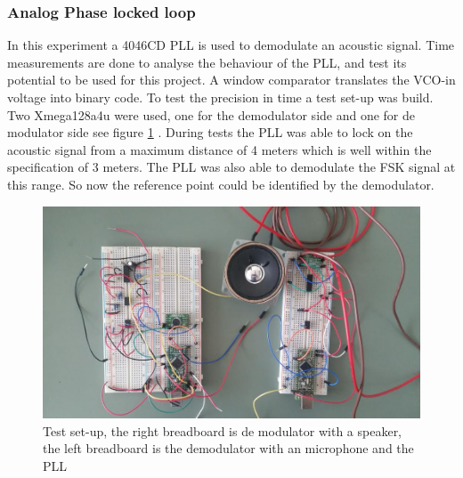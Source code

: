 \documentclass[10pt,a4paper]{article}
\begin{document}
\subsubsection{Analog Phase locked loop}
In this experiment a 4046CD PLL is used to demodulate an acoustic signal. Time measurements are done to analyse the behaviour of the PLL, and test its potential to be used for this project. A window comparator translates the VCO-in voltage into binary code. To test the precision in time a test set-up was build. Two Xmega128a4u were used, one for the demodulator side and one for de modulator side see figure \ref{fig:testup} . During tests the PLL was able to lock on the acoustic signal from a maximum distance of 4 meters which is well within the specification of 3 meters.  The PLL was also able to demodulate the FSK signal at this range. So now the reference point could be identified by the demodulator.

\begin{figure}[H]
   \centering
   \includegraphics[width=\textwidth]{testopstelling.jpg}
   \caption{Test set-up, the right breadboard is de modulator with a speaker, the left breadboard is the demodulator with an microphone and the PLL}
   \label{fig:testup}
\end{figure}

\begin{table}[h]
\centering
{}
\caption{Measured times in clock pulses, pre scaler is set to 1024 }
\label{measuretime}
\end{table}
\end{document}
